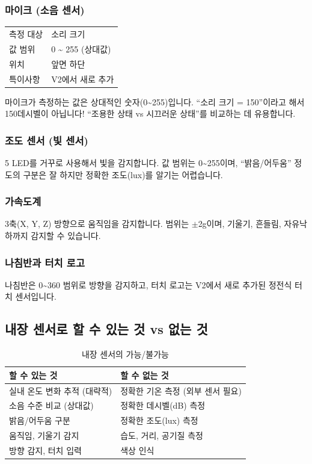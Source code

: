 \documentclass[11pt, a4paper]{article}
\begin{document}
\subsubsection{마이크 (소음 센서)}

\begin{table}[H]\centering
\begin{tabular}{ll}\toprule
측정 대상 & 소리 크기 \\
값 범위 & 0 \textasciitilde{} 255 (상대값) \\
위치 & 앞면 하단 \\
특이사항 & V2에서 새로 추가 \\
\bottomrule
\end{tabular}
\end{table}

마이크가 측정하는 값은 상대적인 숫자(0\textasciitilde255)입니다. ``소리 크기 = 150''이라고 해서 150데시벨이 아닙니다! ``조용한 상태 vs 시끄러운 상태''를 비교하는 데 유용합니다.

\subsubsection{조도 센서 (빛 센서)}

5 LED를 거꾸로 사용해서 빛을 감지합니다. 값 범위는 0\textasciitilde255이며, ``밝음/어두움'' 정도의 구분은 잘 하지만 정확한 조도(lux)를 알기는 어렵습니다.

\subsubsection{가속도계}

3축(X, Y, Z) 방향으로 움직임을 감지합니다. 범위는 $\pm$2g이며, 기울기, 흔들림, 자유낙하까지 감지할 수 있습니다.

\subsubsection{나침반과 터치 로고}

나침반은 0\textdegree\textasciitilde360\textdegree{} 범위로 방향을 감지하고, 터치 로고는 V2에서 새로 추가된 정전식 터치 센서입니다.

\subsection{내장 센서로 할 수 있는 것 vs 없는 것}

\begin{table}[H]\centering
\caption{내장 센서의 가능/불가능}
\begin{tabular}{p{6cm}p{6.5cm}}\toprule
\textbf{할 수 있는 것} & \textbf{할 수 없는 것} \\\midrule
실내 온도 변화 추적 (대략적) & 정확한 기온 측정 (외부 센서 필요) \\
소음 수준 비교 (상대값) & 정확한 데시벨(dB) 측정 \\
밝음/어두움 구분 & 정확한 조도(lux) 측정 \\
움직임, 기울기 감지 & 습도, 거리, 공기질 측정 \\
방향 감지, 터치 입력 & 색상 인식 \\
\bottomrule
\end{tabular}
\end{table}
\end{document}
